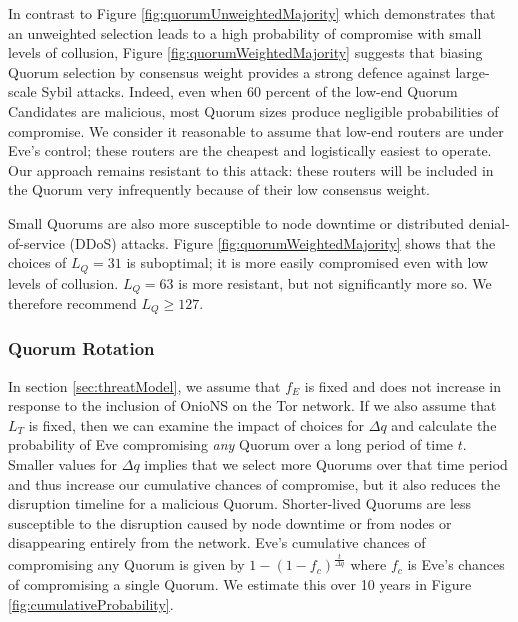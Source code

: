 \documentclass[conference]{IEEEtran}
\begin{document}
In contrast to Figure \ref{fig:quorumUnweightedMajority} which demonstrates that an unweighted selection leads to a high probability of compromise with small levels of collusion, Figure \ref{fig:quorumWeightedMajority} suggests that biasing Quorum selection by consensus weight provides a strong defence against large-scale Sybil attacks. Indeed, even when 60 percent of the low-end Quorum Candidates are malicious, most Quorum sizes produce negligible probabilities of compromise. We consider it reasonable to assume that low-end routers are under Eve's control; these routers are the cheapest and logistically easiest to operate. Our approach remains resistant to this attack: these routers will be included in the Quorum very infrequently because of their low consensus weight.

Small Quorums are also more susceptible to node downtime or distributed denial-of-service (DDoS) attacks. Figure \ref{fig:quorumWeightedMajority} shows that the choices of $ L_{Q} = 31 $ is suboptimal; it is more easily compromised even with low levels of collusion. $ L_{Q} = 63 $ is more resistant, but not significantly more so. We therefore recommend $ L_{Q} \geq 127 $.

\subsubsection{Quorum Rotation}

In section \ref{sec:threatModel}, we assume that $ f_{E} $ is fixed and does not increase in response to the inclusion of OnioNS on the Tor network. If we also assume that $ L_{T} $ is fixed, then we can examine the impact of choices for $ \Delta q $ and calculate the probability of Eve compromising \emph{any} Quorum over a long period of time $ t $. Smaller values for $ \Delta q $ implies that we select more Quorums over that time period and thus increase our cumulative chances of compromise, but it also reduces the disruption timeline for a malicious Quorum. Shorter-lived Quorums are less susceptible to the disruption caused by node downtime or from nodes or disappearing entirely from the network. Eve's cumulative chances of compromising any Quorum is given by $ 1 - (1 - f_{c})^{\frac{t}{\Delta q}} $ where $ f_{c} $ is Eve's chances of compromising a single Quorum. We estimate this over 10 years in Figure \ref{fig:cumulativeProbability}.
\end{document}
